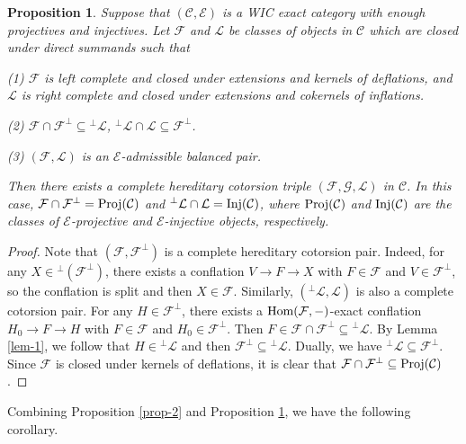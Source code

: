 \documentclass[reqno,12pt]{amsart}
\numberwithin{equation}{section}
\theoremstyle{plain}
\newtheorem{proposition}[theorem]{\bf Proposition}
\theoremstyle{definition}
\begin{document}
\begin{proposition}\label{prop-7}
    Suppose that $(\mathcal{C},\mathcal{E})$ is a WIC exact category with enough
    projectives and injectives. Let $\mathcal{F}$ and $\mathcal{L}$ be classes of objects in
    $\mathcal{C}$ which are closed under direct summands such that

    {\rm (1)} $\mathcal{F}$ is left complete and closed under extensions and kernels of deflations, and $\mathcal{L}$ is right complete and closed under extensions and cokernels of inflations.

    {\rm (2)} $\mathcal{F}\cap\mathcal{F}^{\bot}\subseteq {^{\bot}\mathcal{L}}$, ${^{\bot}\mathcal{L}}\cap\mathcal{L}\subseteq \mathcal{F}^{\bot}$.

    {\rm (3)} $(\mathcal{F},\mathcal{L})$ is an $\mathcal{E}$-admissible balanced pair.

Then there exists a complete hereditary cotorsion triple $(\mathcal{F},\mathcal{G},\mathcal{L})$ in $\mathcal{C}$. In this case, $\mathcal{F}\cap\mathcal{F}^{\bot}={\rm Proj}(\mathcal{C})$ and ${^{\bot}\mathcal{L}}\cap\mathcal{L}={\rm Inj}(\mathcal{C})$, where ${\rm Proj}(\mathcal{C})$ and ${\rm Inj}(\mathcal{C})$ are the classes of $\mathcal{E}$-projective and $\mathcal{E}$-injective objects, respectively.
\end{proposition}

\begin{proof}
    Note that $(\mathcal{F},\mathcal{F}^{\bot})$ is a complete hereditary cotorsion pair. Indeed, for any $X\in{^{\bot}(\mathcal{F}^{\bot})}$, there exists a conflation $V\to F\to X$ with $F\in\mathcal{F}$ and $V\in{\mathcal{F}^{\bot}}$, so the conflation is split and then $X\in\mathcal{F}$. Similarly, $({^{\bot}\mathcal{L}},\mathcal{L})$ is also a complete cotorsion pair. For any $H\in\mathcal{F}^{\bot}$, there exists a $\mbox{\rm Hom}(\mathcal{F},-)$-exact conflation $H_0\to F\to H$ with $F\in\mathcal{F}$ and $H_0\in \mathcal{F}^{\bot}$. Then $F\in\mathcal{F}\cap\mathcal{F}^{\bot}\subseteq {^{\bot}\mathcal{L}}$. By Lemma \ref{lem-1}, we follow that $H\in{^{\bot}\mathcal{L}}$ and then $\mathcal{F}^{\bot}\subseteq {^{\bot}\mathcal{L}}$. Dually, we have ${^{\bot}\mathcal{L}}\subseteq \mathcal{F}^{\bot}$. Since $\mathcal{F}$ is closed under kernels of deflations, it is clear that $\mathcal{F}\cap\mathcal{F}^{\bot}\subseteq{\rm Proj}(\mathcal{C})$.
\end{proof}

Combining Proposition \ref{prop-2} and Proposition \ref{prop-7}, we have the following corollary.
\end{document}
